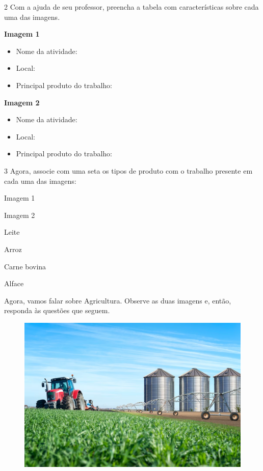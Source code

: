 \num{2} Com a ajuda de seu professor, preencha a tabela com características
sobre cada uma das imagens.\bigskip

\textbf{Imagem 1}
\begin{itemize}
\item Nome da atividade: 

\item Local: 

\item Principal produto do trabalho: 
\end{itemize}

\textbf{Imagem 2}
\begin{itemize}
\item Nome da atividade: 

\item Local: 

\item Principal produto do trabalho: 
\end{itemize}

\pagebreak
\num{3} Agora, associe com uma seta os tipos de produto com o trabalho presente em cada uma das imagens:

\begin{multicols}{2}

Imagem 1

Imagem 2

\columnbreak

Leite

Arroz

Carne bovina

Alface
\end{multicols}


\noindent{}Agora, vamos falar sobre Agricultura. Observe as duas imagens e, então, responda às questões que seguem.

\begin{figure}[htpb!]
\includegraphics[width=\textwidth]{./imgs/img57.png}
\end{figure}

